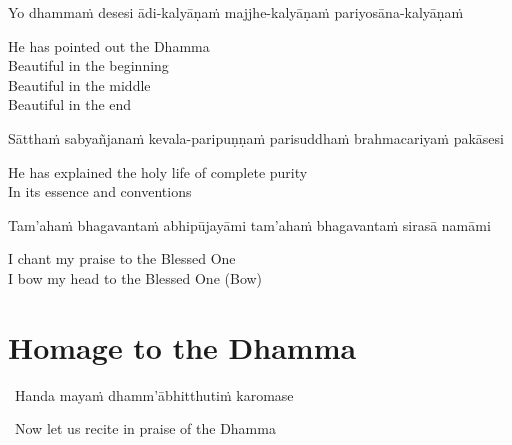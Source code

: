 \begin{pali-hang}
  Yo dhammaṁ desesi ādi-kalyāṇaṁ majjhe-kalyāṇaṁ pariyosāna-kalyāṇaṁ
\end{pali-hang}

\begin{english-verses}
  He has pointed out the Dhamma\\
  Beautiful in the beginning\\
  Beautiful in the middle\\
  Beautiful in the end\\
\end{english-verses}

\begin{pali-hang}
  Sātthaṁ sabyañjanaṁ kevala-paripuṇṇaṁ parisuddhaṁ brahmacariyaṁ pakāsesi
\end{pali-hang}

\begin{english}
  He has explained the holy life of complete purity\makeatletter\hyperlink{endnote4-appendix}\makeatother\\
  In its essence and conventions
\end{english}

\suttaRef{[SN 55.7]}

\begin{pali-hang}
  Tam'ahaṁ bhagavantaṁ abhipūjayāmi tam'ahaṁ bhagavantaṁ sirasā namāmi
\end{pali-hang}

\begin{english}
  I chant my praise to the Blessed One\\
  I bow my head to the Blessed One \hfill{\textnormal{\fontsize{12.5}{18}\selectfont (Bow)}}
\end{english}

\suttaRef{[Thai]}



\section{Homage to the Dhamma}
\label{homage-dhamma}

\begin{leader}
  \anglebracketleft\ \hspace{-0.5mm}Handa mayaṁ dhamm'ābhitthutiṁ karomase \hspace{-0.5mm}\anglebracketright\
\end{leader}
\begin{leader-english-belowpali}
  \anglebracketleft\ \hspace{-0.5mm}Now let us recite in praise of the Dhamma \hspace{-0.5mm}\anglebracketright\
\end{leader-english-belowpali}

